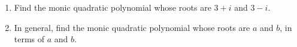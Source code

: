 \begin{enumerate}
\item[(a)] Find the monic quadratic polynomial whose roots are $3+i$ and $3-i$.
\item[(b)] In general, find the monic quadratic polynomial whose roots are $a$ and $b$, in terms of $a$ and $b$.
\end{enumerate}
